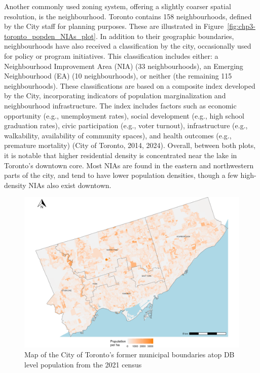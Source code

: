 \documentclass[
11pt, %
oneside, %
english, %
singlespacing, %
]{macthesis} %
\begin{document}
Another commonly used zoning system, offering a slightly coarser spatial resolution, is the neighbourhood. Toronto contains 158 neighbourhoods, defined by the City staff for planning purposes. These are illustrated in Figure~\ref{fig:chp3-toronto_popden_NIAs_plot}. In addition to their geographic boundaries, neighbourhoods have also received a classification by the city, occasionally used for policy or program initiatives. This classification includes either: a Neighbourhood Improvement Area (NIA) (33 neighbourhoods), an Emerging Neighbourhood (EA) (10 neighbourhoods), or neither (the remaining 115 neighbourhoods). These classifications are based on a composite index developed by the City, incorporating indicators of population marginalization and neighbourhood infrastructure. The index includes factors such as economic opportunity (e.g., unemployment rates), social development (e.g., high school graduation rates), civic participation (e.g., voter turnout), infrastructure (e.g., walkability, availability of community spaces), and health outcomes (e.g., premature mortality) (City of Toronto, 2014, 2024). Overall, between both plots, it is notable that higher residential density is concentrated near the lake in Toronto's downtown core. Most NIAs are found in the eastern and northwestern parts of the city, and tend to have lower population densities, though a few high-density NIAs also exist downtown.

\begin{figure}

{\centering \includegraphics[width=6in]{./data/figures/chp3-former_muni_boundaries_plot} 

}

\caption{\label{fig:chp3-former_muni_boundaries_plot}Map of the City of Toronto's former municipal boundaries atop DB level population from the 2021 census}\label{fig:unnamed-chunk-43}
\end{figure}
\end{document}
